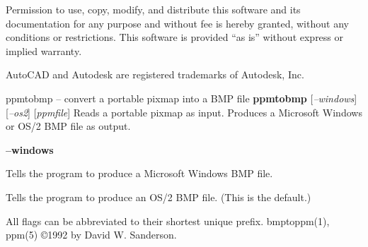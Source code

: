 \par
Permission to use, copy, modify, and distribute this software and its
documentation for any purpose and without fee is hereby granted,
without any conditions or restrictions.  This software is provided ``as
is'' without express or implied warranty.
\par
AutoCAD and Autodesk are registered trademarks of Autodesk, Inc.
%
 
%

\newpage
%

ppmtobmp -- convert a portable pixmap into a BMP file
{\bf ppmtobmp}
{\rm [}{\it --windows}{\rm ]}
{\rm [}{\it --os2}{\rm ]}
{\rm [}{\it ppmfile}{\rm ]}
Reads a portable pixmap as input.
Produces a Microsoft Windows or OS/2 BMP file as output.
\begin{TPlist}{{\bf --windows}}
\item[{{\bf --windows}}]
Tells the program to produce a Microsoft Windows BMP file.
\item[{{\bf --os2}}]
Tells the program to produce an OS/2 BMP file.
(This is the default.)
\end{TPlist}

\par
All flags can be abbreviated to their shortest unique prefix.
bmptoppm(1),
ppm(5)
\copyright 1992 by David W. Sanderson.
%
 
